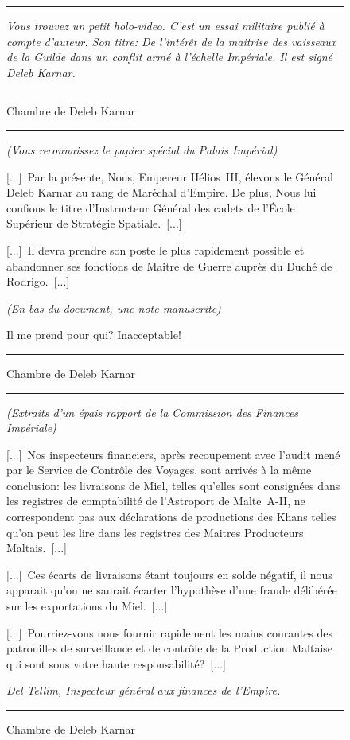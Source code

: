 \documentclass{article}
\newcommand{\newcharacter}{\clearpage\setcounter{figure}{0}}
\newcommand{\indice}[4]{
  \begin{figure}[H]
    \begin{center}
      \rule{0.5\textwidth}{1pt}
    \end{center}
    \begin{framed}
      \begin{samepage}
        \textit{#1}
        \nopagebreak

        #2

        \nopagebreak

        \hfill\textit{#3}
      \end{samepage}
    \end{framed}
    \caption{#4}
    \begin{center}
      \rule{0.5\textwidth}{1pt}
    \end{center}
  \end{figure}
}
\begin{document}
\newcharacter

\indice
{
    Vous trouvez un petit holo-video. C'est un essai militaire publié à compte
    d'auteur. Son titre: \og De l'intérêt de la maitrise des vaisseaux de la
    Guilde dans un conflit armé à l'échelle Impériale\fg{}. Il est signé Deleb
    Karnar.
}{}
{}
{Chambre de Deleb Karnar}

\indice
{(Vous reconnaissez le papier spécial du Palais Impérial)}
{
    [...]~Par la présente, Nous, Empereur Hélios~III, élevons le Général Deleb
    Karnar au rang de Maréchal d'Empire. De plus, Nous lui confions le titre
    d'Instructeur Général des cadets de l'École Supérieur de Stratégie
    Spatiale.~[...]

    \nobreak

    [...]~Il devra prendre son poste le plus rapidement possible et abandonner
    ses fonctions de Maitre de Guerre auprès du Duché de Rodrigo.~[...]

    \nobreak

    \textit{(En bas du document, une note manuscrite)}

    \nobreak

    Il me prend pour qui? Inacceptable!
}{}
{Chambre de Deleb Karnar}

\indice
{(Extraits d'un épais rapport de la Commission des Finances Impériale)}
{
    [...]~Nos inspecteurs financiers, après recoupement avec l'audit mené par
    le Service de Contrôle des Voyages, sont arrivés à la même conclusion: les
    livraisons de Miel, telles qu'elles sont consignées dans les registres de
    comptabilité de l'Astroport de Malte~A-II, ne correspondent pas aux
    déclarations de productions des Khans telles qu'on peut les lire dans les
    registres des Maitres Producteurs Maltais.~[...]

    \nobreak

    [...]~Ces écarts de livraisons étant toujours en solde négatif, il nous
    apparait qu'on ne saurait écarter l'hypothèse d'une fraude délibérée sur
    les exportations du Miel.~[...]

    \nobreak

    [...]~Pourriez-vous nous fournir rapidement les mains courantes des
    patrouilles de surveillance et de contrôle de la Production Maltaise qui
    sont sous votre haute responsabilité?~[...]
}{Del Tellim, Inspecteur général aux finances de l'Empire.}
{Chambre de Deleb Karnar}

\newcharacter
\end{document}

